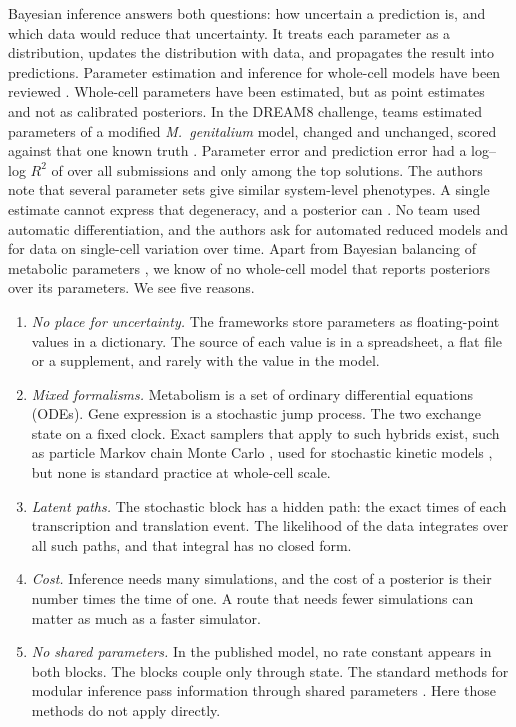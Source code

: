 Bayesian inference answers both questions: how uncertain a prediction is, and which data
would reduce that uncertainty. It treats each parameter as a
distribution, updates the distribution with data, and propagates the result into
predictions. Parameter estimation and inference for whole-cell models have been reviewed \cite{babtie2017how}.
Whole-cell parameters have been estimated, but as point estimates and not as calibrated
posteriors. In the DREAM8 challenge, teams estimated  parameters of a
modified \textit{M.\ genitalium} model,  changed and  unchanged,
scored against that one known truth \cite{karr2015summary}. Parameter error and prediction
error had a log--log $R^2$ of  over all submissions and only 
among the top solutions. The authors note that several parameter sets give similar
system-level phenotypes. A single estimate cannot express that degeneracy, and a posterior can
\cite{gutenkunst2007universally}. No team used automatic differentiation, and the authors ask for automated reduced models and for data on single-cell variation over
time. Apart from Bayesian balancing of metabolic parameters \cite{lubitz2010parameter,thornburg2022fundamental}, we know of
no whole-cell model
that reports posteriors over its parameters. We see five reasons.

\begin{enumerate}
  \item \emph{No place for uncertainty.} The frameworks store parameters as
  floating-point values in a dictionary. The source of each value is in a
  spreadsheet, a flat file or a supplement, and rarely with the value in the model.
  \item \emph{Mixed formalisms.} Metabolism is a set of ordinary differential
  equations (ODEs). Gene expression is a stochastic jump process. The two exchange
  state on a fixed clock. Exact samplers that apply to such hybrids exist, such as particle Markov
  chain Monte Carlo \cite{andrieu2010particle}, used for stochastic kinetic models
  \cite{golightly2011bayesian}, but none is standard practice
  at whole-cell scale.
  \item \emph{Latent paths.} The stochastic block has a hidden path: the exact
  times of each transcription and translation event. The likelihood of the data
  integrates over all such paths, and that integral has no closed form.
  \item \emph{Cost.} Inference needs many simulations, and the cost of a posterior is
  their number times the time of one. A route that needs fewer simulations can matter as much as a
  faster simulator.
  \item \emph{No shared parameters.} In the published \syn{} model, no rate
  constant appears in both blocks. The blocks couple only through state. The
  standard methods for modular inference pass information through shared
  parameters \cite{plummer2015cuts,jacob2017better,carmona2020semimodular}.
  Here those methods do not apply directly.
\end{enumerate}

